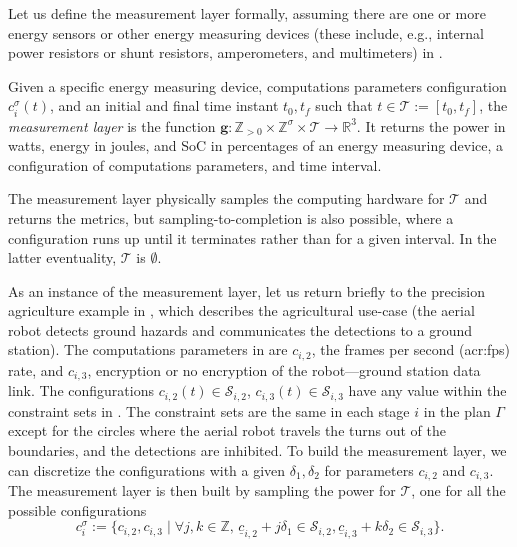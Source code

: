 Let us define the measurement layer formally, assuming there are one or more energy sensors or other energy measuring devices (these include, e.g., internal power resistors or shunt resistors, amperometers, and multimeters) in .

\begin{defn}
  \label{def:measur-layer}
  Given a specific energy measuring device, computations parameters configuration $c_i^\sigma(t)$, and an initial and final time instant $t_0,t_f$ such that $t\in\mathcal{T}:=[t_0,t_f]$, the \textit{measurement layer} is the function
  $\mathbf{g}:\mathbb{Z}_{>0}\times\mathbb{Z}^\sigma\times\mathcal{T}\rightarrow\mathbb{R}^3$.
  It returns the power in watts, energy in joules, and SoC in percentages of an energy measuring device, a configuration of computations parameters, and time interval.
\end{defn}

The measurement layer physically samples the computing hardware for $\mathcal{T}$ and returns the metrics, but sampling-to-completion is also possible, where a configuration runs up until it terminates rather than for a given interval. In the latter eventuality, $\mathcal{T}$ is ${\emptyset}$.

As an instance of the measurement layer, let us return briefly to the precision agriculture example in , which describes the agricultural use-case (the aerial robot detects ground hazards and communicates the detections to a ground station). The computations parameters in  are $c_{i,2}$, the frames per second (\Gls{acr:fps}) rate, and $c_{i,3}$, encryption or no encryption of the robot---ground station data link. The configurations $c_{i,2}(t)\in\mathcal{S}_{i,2}$, $c_{i,3}(t)\in\mathcal{S}_{i,3}$ have any value within the constraint sets in . The constraint sets are the same in each stage  $i$ in the plan $\Gamma$ except for the circles where the aerial robot travels the turns out of the boundaries, and the detections are inhibited. To build the measurement layer, we can discretize the configurations with a given $\delta_1,\delta_2$ for parameters $c_{i,2}$ and $c_{i,3}$. The measurement layer is then built by sampling the power for $\mathcal{T}$, one for all the possible configurations
\begin{equation}\label{eq:meas-layer-lin-sampl}
  c_i^\sigma:=\{c_{i,2},c_{i,3}\mid\forall j,k\in\mathbb{Z},\, \underline{c}_{i,2}+j\delta_1\in\mathcal{S}_{i,2},\underline{c}_{i,3}+k\delta_2\in\mathcal{S}_{i,3}\}.
\end{equation}

